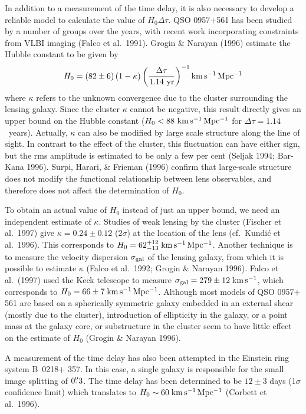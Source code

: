 \documentclass[a4paper,10pt]{article} %
\newcommand{\farcs}{\hbox{$.\!\!^{\prime\prime}$}}
\begin{document}
In addition to a measurement of the time delay, it is also necessary
to develop a reliable model to calculate the value of
$H_0\Delta\tau$. QSO 0957$+$561 has been studied by a number of groups
over the years, with recent work incorporating constraints from VLBI
imaging (Falco et al.\ 1991). Grogin \& Narayan (1996) estimate the
Hubble constant to be given by
\begin{equation}
  H_0 = \left(82\pm6\right)(1-\kappa)
  \left(\frac{\Delta\tau}{1.14~{\rm yr}}\right)^{-1}
  {\rm km\,s^{-1}\,Mpc^{-1}}
\label{eq:3.39}
\end{equation}
where $\kappa$ refers to the unknown convergence due to the cluster
surrounding the lensing galaxy. Since the cluster $\kappa$ cannot be
negative, this result directly gives an upper bound on the Hubble
constant ($H_0 <88~{\rm km\,s^{-1}\,Mpc^{-1}}$ for
$\Delta\tau=1.14$~years). Actually, $\kappa$ can also be modified by
large scale structure along the line of sight. In contrast to the
effect of the cluster, this fluctuation can have either sign, but the
rms amplitude is estimated to be only a few per cent (Seljak 1994;
Bar-Kana 1996). Surpi, Harari, \& Frieman (1996) confirm that
large-scale structure does not modify the functional relationship
between lens observables, and therefore does not affect the
determination of $H_0$.

To obtain an actual value of $H_0$ instead of just an upper bound, we
need an independent estimate of $\kappa$. Studies of weak lensing by
the cluster (Fischer et al.\ 1997) give $\kappa=0.24\pm0.12$
($2\sigma$) at the location of the lens (cf.\ Kundi\'c et al.\ 1996).
This corresponds to $H_0=62_{-13}^{+12}\;{\rm km\,s^{-1}\,Mpc^{-1}}$.
Another technique is to measure the velocity dispersion $\sigma_{\rm
gal}$ of the lensing galaxy, from which it is possible to estimate
$\kappa$ (Falco et al.\ 1992; Grogin \& Narayan 1996). Falco et al.\
(1997) used the Keck telescope to measure $\sigma_{\rm
gal}=279\pm12\;{\rm km\,s^{-1}}$, which corresponds to
$H_0=66\pm7\;{\rm km\,s^{-1}\,Mpc^{-1}}$. Although most models of QSO
0957$+$561 are based on a spherically symmetric galaxy embedded in an
external shear (mostly due to the cluster), introduction of
ellipticity in the galaxy, or a point mass at the galaxy core, or
substructure in the cluster seem to have little effect on the estimate
of $H_0$ (Grogin \& Narayan 1996).

A measurement of the time delay has also been attempted in the
Einstein ring system B~0218$+$ 357. In this case, a single galaxy is
responsible for the small image splitting of $0\farcs3$. The time delay
has been determined to be $12\pm3$ days (1$\sigma$ confidence limit)
which translates to $H_0\sim60\;{\rm km\,s^{-1}\,Mpc^{-1}}$ (Corbett
et al.\ 1996).
\end{document}

